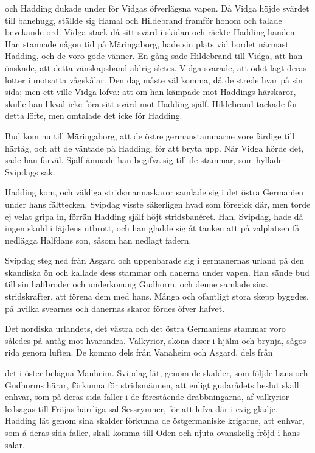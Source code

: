 och Hadding dukade under för Vidgas öfverlägsna vapen. Då Vidga höjde
svärdet till banehugg, ställde sig Hamal och Hildebrand framför honom
och talade bevekande ord. Vidga stack då sitt svärd i skidan och räckte
Hadding handen. Han stannade någon tid på Märingaborg, hade sin plats
vid bordet närmast Hadding, och de voro gode vänner. En gång sade
Hildebrand till Vidga, att han önskade, att detta vänskapsband aldrig
sletes. Vidga svarade, att ödet lagt deras lotter i motsatta vågskålar.
Den dag måste väl komma, då de strede hvar på sin sida; men ett ville
Vidga lofva: att om han kämpade mot Haddings härskaror, skulle han
likväl icke föra sitt svärd mot Hadding själf. Hildebrand tackade för
detta löfte, men omtalade det icke för Hadding.

Bud kom nu till Märingaborg, att de östre germanstammarne vore färdige
till härtåg, och att de väntade på Hadding, för att bryta upp. När Vidga
hörde det, sade han farväl. Själf ämnade han begifva sig till de
stammar, som hyllade Svipdags sak.

Hadding kom, och väldiga stridsmannaskaror samlade sig i det östra
Germanien under hans fälttecken. Svipdag visste säkerligen hvad som
föregick där, men torde ej velat gripa in, förrän Hadding själf höjt
stridsbanéret. Han, Svipdag, hade då ingen skuld i fäjdens utbrott, och
han gladde sig åt tanken att på valplatsen få nedlägga Halfdans son,
såsom han nedlagt fadern.

Svipdag steg ned från Asgard och uppenbarade sig i germanernas urland på
den skandiska ön och kallade dess stammar och danerna under vapen. Han
sände bud till sin halfbroder och underkonung Gudhorm, och denne samlade
sina stridskrafter, att förena dem med hans. Många och ofantligt stora
skepp byggdes, på hvilka svearnes och danernas skaror fördes öfver
hafvet.

Det nordiska urlandets, det västra och det östra Germaniens stammar voro
således på antåg mot hvarandra. Valkyrior, sköna diser i hjälm och
brynja, sågos rida genom luften. De kommo dels från Vanaheim och Asgard,
dels från

det i öster belägna Manheim. Svipdag lät, genom de skalder, som följde
hans och Gudhorms härar, förkunna för stridsmännen, att enligt
gudarådets beslut skall enhvar, som på deras sida faller i de
förestående drabbningarna, af valkyrior ledsagas till Fröjas härrliga
sal Sessrymner, för att lefva där i evig glädje. Hadding lät genom sina
skalder förkunna de östgermaniske krigarne, att enhvar, som å deras sida
faller, skall komma till Oden och njuta ovanskelig fröjd i hans salar.


